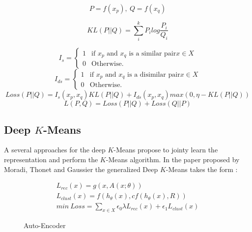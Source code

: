 \begin{equation*}
  P = f(x_p), ~ Q = f(x_q)
\end{equation*}

\begin{equation*}
  KL(P||Q) = \sum_i^k P_ilog\frac{P_i}{Q_i}
\end{equation*}

\begin{equation*}
  I_s = \left\{
\begin{array}{ll}
  1 & \mbox{if $x_p$ and $x_q$ is a similar pair} x \in X\\
  0 & \mbox{Otherwise.}
\end{array}
\right.
\end{equation*}
%
\begin{equation*}
  I_{ds} = \left\{
\begin{array}{ll}
  1 & \mbox{if $x_p$ and $x_q$ is a disimilar pair} x \in X\\
  0 & \mbox{Otherwise.}
\end{array}
\right.
\end{equation*}
\begin{equation*}
  Loss(P || Q) = I_s(x_p, x_q)KL(P || Q) + I_{ds}(x_p, x_q)max(0, \eta-KL(P || Q))
\end{equation*}
\begin{equation*}
  L(P,Q) = Loss(P || Q) + Loss(Q || P)
\end{equation*}
\subsection{Deep $K$-Means}
A several approaches for the deep $K$-Means propose to jointy learn the
representation and perform the $K$-Means algorithm. 
In the paper proposed by Moradi, Thonet and Gaussier \cite{Deap-K-Means} the
generalized Deep $K$-Means takes the form :

\begin{gather*}
  L_{rec}(x) = g(x, A(x; \theta)) \\
  L_{clust}(x) = f(h_\theta(x), cf(h_\theta(x), R))\\
  min~Loss = \sum_{x \in X} \epsilon_0\lambda L_{rec}(x) + \epsilon_1 L_{clust}
  (x)
\end{gather*}
\begin{figure}[!h]
  \centering
  
  \caption{Auto-Encoder}
  \label{fig:AE}
\end{figure}